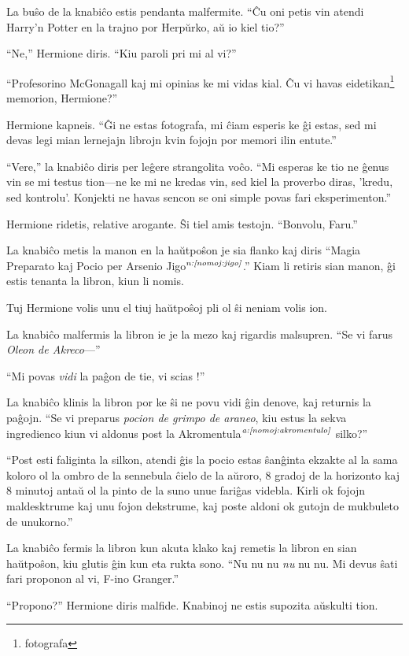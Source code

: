 La buŝo de la knabiĉo estis pendanta malfermite. ``Ĉu oni petis vin
atendi Harry'n Potter en la trajno por Herpŭrko, aŭ io kiel tio?''

``Ne,'' Hermione diris. ``Kiu paroli pri mi al vi?''

``Profesorino McGonagall kaj mi opinias ke mi vidas kial. Ĉu vi havas
eidetikan\footnote{fotografa} memorion, Hermione?''

Hermione kapneis. ``Ĝi ne estas fotografa, mi ĉiam esperis ke ĝi
estas, sed mi devas legi mian lernejajn librojn kvin fojojn por memori
ilin entute.''

``Vere,'' la knabiĉo diris per leĝere strangolita voĉo. ``Mi esperas ke
tio ne ĝenus vin se mi testus tion—ne ke mi ne kredas vin, sed kiel la
proverbo diras, 'kredu, sed kontrolu'. Konjekti ne havas sencon se oni
simple povas fari eksperimenton.''

Hermione ridetis, relative arogante. Ŝi tiel amis
testojn. ``Bonvolu, Faru.''

La knabiĉo metis la manon en la haŭtpoŝon je sia flanko kaj diris
``Magia Preparato kaj Pocio per Arsenio Jigo$^{\textit{n:\ref{nomoj:jigo}}}$.''
Kiam li retiris sian manon, ĝi estis tenanta la libron, kiun li nomis.

Tuj Hermione volis unu el tiuj haŭtpoŝoj pli ol ŝi neniam volis ion.

La knabiĉo malfermis la libron ie je la mezo kaj rigardis
malsupren. ``Se vi farus \emph{Oleon de Akreco}—''

``Mi povas \emph{vidi} la paĝon de tie, vi scias !''

La knabiĉo klinis la libron por ke ŝi ne povu vidi ĝin denove, kaj
returnis la paĝojn. ``Se vi preparus \emph{pocion de grimpo de
  araneo}, kiu estus la sekva ingredienco kiun vi aldonus post la
Akromentula$^{\textit{a:\ref{nomoj:akromentulo}}}$ silko?''

``Post esti faliginta la silkon, atendi ĝis la pocio estas ŝanĝinta
ekzakte al la sama koloro ol la ombro de la sennebula ĉielo de la
aŭroro, 8 gradoj de la horizonto kaj 8 minutoj antaŭ ol la pinto de la
suno unue fariĝas videbla. Kirli ok fojojn maldesktrume kaj unu fojon
dekstrume, kaj poste aldoni ok gutojn de mukbuleto de unukorno.''

La knabiĉo fermis la libron kun akuta klako kaj remetis la libron en
sian haŭtpoŝon, kiu glutis ĝin kun eta rukta sono. ``Nu nu nu
\emph{nu} nu nu. Mi devus ŝati fari proponon al vi, F-ino Granger.''

``Propono?'' Hermione diris malfide. Knabinoj ne estis supozita
aŭskulti tion.

